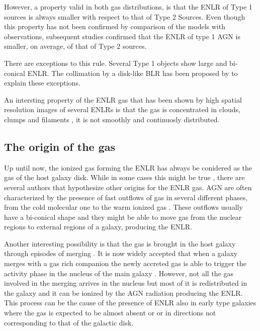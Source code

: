 \documentclass[../thesis.tex]{subfiles}
\begin{document}
However, a property valid in both gas distributions, is that the ENLR of Type 1 sources is always smaller with respect to that of Type 2 Sources.
Even though this property has not been confirmed by \citet{Mulchaey96b} comparison of the models with observations, subsequent studies \citep[e.g.][]{Schmitt03b} confirmed that the ENLR of type 1 AGN is smaller, on average, of that of Type 2 sources.

There are exceptions to this rule.
Several Type 1 objects \citep[e.g. NGC 4151][]{Pogge89,Evans93} show large and bi-conical ENLR.
The collimation by a disk-like BLR has been proposed by \citet{Evans93} to explain these exceptions.

An intersting property of the ENLR gas that has been shown by high spatial resolution images of several ENLRs is that the gas is concentrated in clouds, clumps and filaments \citep[e.g.][]{Tadhunter89,Mulchaey96a,Mulchaey96b,Schmitt03,Schmitt03b}, it is not smoothly and continuosly distributed.

\subsection{The origin of the gas}

Up until now, the ionized gas forming the ENLR has always be conidered as the gas of the host galaxy disk.
While in some cases this might be true \citep[e.g.][]{Fischer17}, there are several authors that hypothesize other origins for the ENLR gas.
AGN are often characterized by the presence of fast outflows of gas in several different phases, from the cold molecular one to the warm ionized gas \citep{Baldwin87,Hutchings98,Crenshaw00,Crenshaw00b,Dasyra15,Morganti15,Morganti18}.
These outflows usually have a bi-conical shape \citep{Pogge88,Schmitt94,Fischer13} and they might be able to move gas from the nuclear regions to external regions of a galaxy, producing the ENLR.

Another interesting possibility is that the gas is brought in the host galaxy through episodes of merging \citep{Veilleux99,Ciroi05,DiMille07,Cracco11}.
It is now widely accepted that when a galaxy merges with a gas rich companion the newly accreted gas is able to trigger the activity phase in the nucleus of the main galaxy \citep{Sanders88,Hong15}.
However, not all the gas involved in the merging arrives in the nucleus but most of it is redistributed in the galaxy and it can be ionized by the AGN radiation producing the ENLR.
This process can be the cause of the presence of ENLR also in early type galaxies where the gas is expected to be almost absent or or in directions not corresponding to that of the galactic disk.
\end{document}
